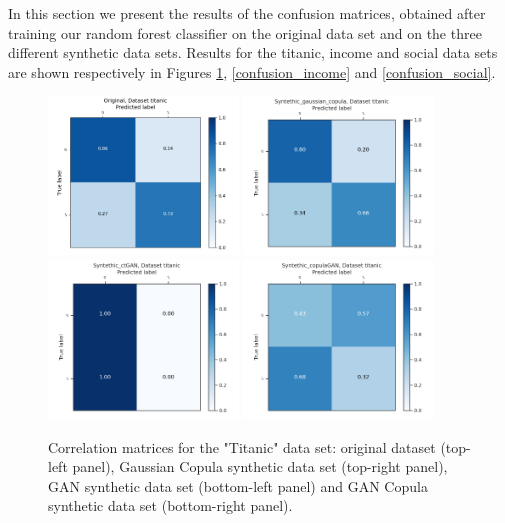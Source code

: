 \documentclass{article}
\begin{document}
In this section we present the results of the confusion matrices, obtained after training our random forest classifier on the original data set and on the three different synthetic data sets. Results for the titanic, income and social data sets are shown respectively in Figures \ref{confusion_titanic}, \ref{confusion_income} and \ref{confusion_social}.


\begin{figure}[h!]
	\centering
	\includegraphics[width=0.45\textwidth]{../ConfusionMatrixes/titanic_Original_.png}
	\includegraphics[width=0.45\textwidth]{../ConfusionMatrixes/titanic_Syntethic_gaussian_copula_.png}
	\includegraphics[width=0.45\textwidth]{../ConfusionMatrixes/titanic_Syntethic_ctGAN_.png}
	\includegraphics[width=0.45\textwidth]{../ConfusionMatrixes/titanic_Syntethic_copulaGAN_.png}

	\caption{Correlation matrices for the "Titanic" data set: original dataset (top-left panel), Gaussian Copula synthetic data set (top-right panel), GAN synthetic data set (bottom-left panel) and GAN Copula synthetic data set (bottom-right panel).  }
	\label{confusion_titanic}
\end{figure}
\end{document}
